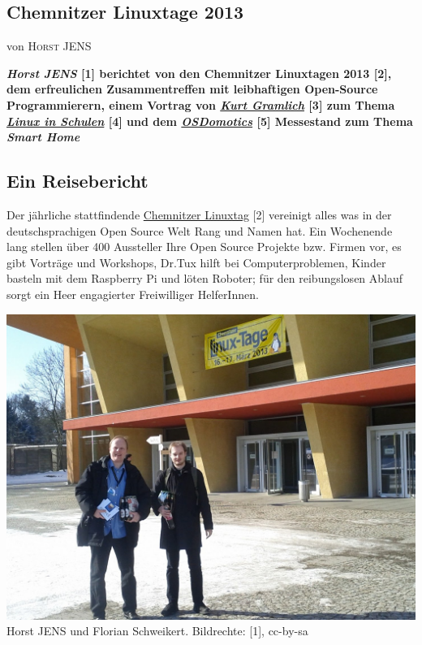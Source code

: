 \documentclass[10pt,a4paper,ngerman,twoside]{article} %
\newcommand{\NewsItem}[1]{ %
\usefont{T1}{fvs}{n}{n} %
\vspace{24pt}\large #1\vspace{3pt} %
\par \normalsize \normalfont}
\newcommand{\NewsAuthor}[1]{ %
\hfill von \textsc{#1} \vspace{20pt} %
\par \normalfont}
\begin{document}
\begin{multicols}{3}
\NewsItem{}
\section*{Chemnitzer Linuxtage 2013}
\label{chemnitz}
\NewsAuthor{Horst JENS}
\textbf{\textit{Horst JENS} [1] berichtet von den Chemnitzer Linuxtagen 2013 [2], dem erfreulichen Zusammentreffen mit leibhaftigen Open-Source Programmierern, einem Vortrag von \href{http://wiki.skolelinux.de/KurtGramlich/Biografie}{\textit{Kurt Gramlich}} [3] zum Thema \href{http://goo.gl/EoIDpy}{\textit{Linux in Schulen}} [4] und dem \href{http://osdomotics.com}{\textit{OSDomotics}}  [5] Messestand zum Thema \textit{Smart Home}}

\subsection*{Ein Reisebericht}

Der jährliche stattfindende \href{http://chemnitzer.linux-tage.de/2013/}{Chemnitzer Linuxtag} [2] vereinigt alles was in der deutschsprachigen Open Source Welt Rang und Namen hat. Ein Wochenende  lang stellen über 400 Aussteller Ihre Open Source Projekte bzw. Firmen vor, es gibt Vorträge und Workshops, Dr.Tux hilft bei Computerproblemen, Kinder basteln mit dem Raspberry Pi und löten Roboter; für den reibungslosen Ablauf sorgt ein Heer engagierter Freiwilliger HelferInnen.

\begin{center}
\includegraphics[width=\linewidth]{chemnitz/chemnitz_eroeffnung.jpg}
\footnotesize{Horst JENS und Florian Schweikert. Bildrechte: [1], cc-by-sa}
\end{center}


\end{multicols}
\end{document}
